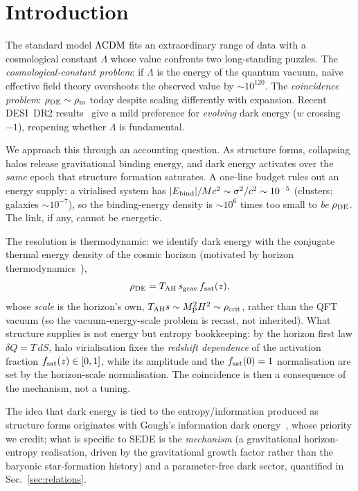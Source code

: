 \section{Introduction}\label{sec:intro}
The standard model $\Lambda\mathrm{CDM}$ fits an extraordinary range of data with a cosmological constant $\Lambda$
whose value confronts two long-standing puzzles. The \emph{cosmological-constant problem}: if $\Lambda$
is the energy of the quantum vacuum, na\"ive effective field theory overshoots the observed value by
$\sim10^{120}$. The \emph{coincidence problem}: $\rho_{\mathrm{DE}}\sim\rho_{\mathrm m}$ today despite scaling
differently with expansion. Recent DESI~DR2 results~\cite{DESI:2025zgx} give a mild preference for
\emph{evolving} dark energy ($w$ crossing $-1$), reopening whether $\Lambda$ is fundamental.

We approach this through an accounting question. As structure forms, collapsing halos release
gravitational binding energy, and dark energy activates over the \emph{same} epoch that structure
formation saturates. A one-line budget rules out an energy supply: a virialised system has
$|E_{\rm bind}|/Mc^2\sim\sigma^2/c^2\sim10^{-5}$ (clusters; galaxies $\sim10^{-7}$), so the
binding-energy density is $\sim10^{6}$ times too small to \emph{be} $\rho_{\mathrm{DE}}$. The link, if any, cannot
be energetic.

The resolution is thermodynamic: we identify dark energy with the conjugate thermal energy density of
the cosmic horizon (motivated by horizon thermodynamics~\cite{Jacobson:1995ab,Cai:2005ra}),
\begin{equation}
\rho_{\mathrm{DE}}=T_{\mathrm{AH}}\,s_{\mathrm{grav}}\,f_{\mathrm{sat}}(z),
\label{eq:ansatz}
\end{equation}
whose \emph{scale} is the horizon's own, $T_{\mathrm{AH}} s\sim M_{\mathrm P}^2H^2\sim\rho_{\mathrm{crit}}$, rather than the QFT vacuum
(so the vacuum-energy-scale problem is recast, not inherited). What structure supplies is not energy
but entropy bookkeeping: by the horizon first law $\delta Q=T\,dS$, halo virialisation fixes the
\emph{redshift dependence} of the activation fraction $f_{\mathrm{sat}}(z)\in[0,1]$, while its amplitude and the
$f_{\mathrm{sat}}(0)=1$ normalisation are set by the horizon-scale normalisation. The coincidence is then a
consequence of the mechanism, not a tuning.

The idea that dark energy is tied to the entropy/information produced as structure forms originates
with Gough's information dark energy~\cite{Gough2008,Gough:2011eq,Gough2025}, whose priority we credit;
what is specific to SEDE is the \emph{mechanism} (a gravitational horizon-entropy realisation, driven
by the gravitational growth factor rather than the baryonic star-formation history) and a
parameter-free dark sector, quantified in Sec.~\ref{sec:relations}.

